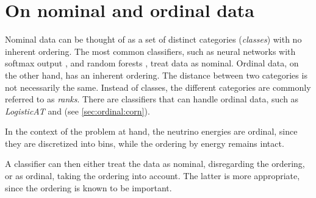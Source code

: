 \section{On nominal and ordinal data}
Nominal data can be thought of as a set of distinct categories
  (\emph{classes})
with no inherent ordering.
The most common classifiers,
  such as
    neural networks with softmax output \cite{dsea_samuel},
    and random forests \cite{hymon2021seasonal},
treat data as nominal.
%
Ordinal data, on the other hand,
has an inherent ordering.
The distance between two categories is not necessarily the same. %
Instead of classes,
  the different categories are commonly referred to as \emph{ranks}.
There are classifiers that can handle ordinal data,
such as
  \emph{LogisticAT} \cite{logisticat, dsea_jan}
  and \corn{} (see \autoref{sec:ordinal:corn}).

In the context of the problem at hand,
  the neutrino energies are ordinal,
    since they are discretized into bins,
      while the ordering by energy remains intact.

A classifier can then either
  treat the data as nominal,
    disregarding the ordering,
  or as ordinal,
    taking the ordering into account.
The latter is more appropriate,
  since the ordering is known to be important. %






